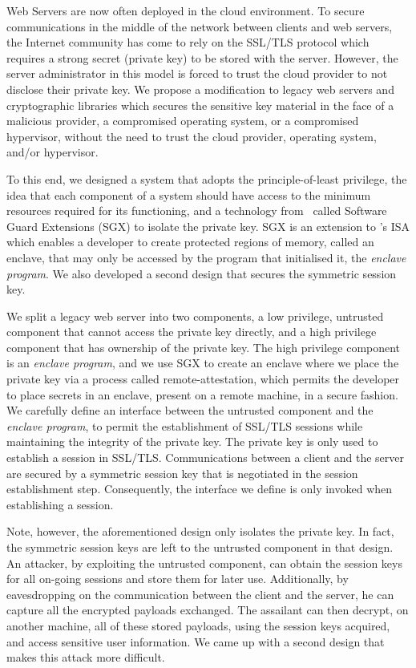 \documentclass[../main.tex]{subfiles}
\begin{document}
   

Web Servers are now often deployed in the cloud environment. To secure
communications in the middle of the network between clients and web
servers, the Internet community has come to rely on the SSL/TLS
protocol which requires a strong secret (private key) to be stored
with the server. However, the server administrator in this model is
forced to trust the cloud provider to not disclose their private key.
We propose a modification to legacy web servers and cryptographic
libraries which secures the sensitive key material in the face of a
malicious provider, a compromised operating system, or a compromised
hypervisor, without the need to trust the cloud provider, operating
system, and/or hypervisor. 

To this end, we designed a system that adopts the principle-of-least
privilege, the idea that each component of a system should have access
to the minimum resources required for its functioning, and a
technology from \Intel~called Software Guard Extensions (SGX) to
isolate the private key. SGX is an extension to \Intel's ISA which
enables a developer to create protected regions of memory, called an
enclave, that may only be accessed by the program that initialised it,
the \textit{enclave program}. We also developed a second design
that secures the symmetric session key.

We split a legacy web server into two components, a low privilege,
untrusted component that cannot access the private key directly, and a
high privilege component that has ownership of the private key. The
high privilege component is an \textit{enclave program}, and we use
SGX to create an enclave where we place the private key via a process
called remote-attestation, which permits the developer to place
secrets in an enclave, present on a remote machine, in a secure
fashion. We carefully define an interface between the untrusted
component and the \textit{enclave program}, to permit the
establishment of SSL/TLS sessions while maintaining the integrity of
the private key. The private key is only used to establish a session
in SSL/TLS. Communications between a client and the server are secured
by a symmetric session key that is negotiated in the session
establishment step. Consequently, the interface we define is only
invoked when establishing a session.

Note, however, the aforementioned design only isolates the private
key. In fact, the symmetric session keys are left to the untrusted
component in that design. An attacker, by exploiting the untrusted
component, can obtain the session keys for all on-going sessions and
store them for later use. Additionally, by eavesdropping on the
communication between the client and the server, he can capture all
the encrypted payloads exchanged. The assailant can then decrypt, on
another machine, all of these stored payloads, using the session keys
acquired, and access sensitive user information. We came up with a
second design that makes this attack more difficult.
\end{document}
